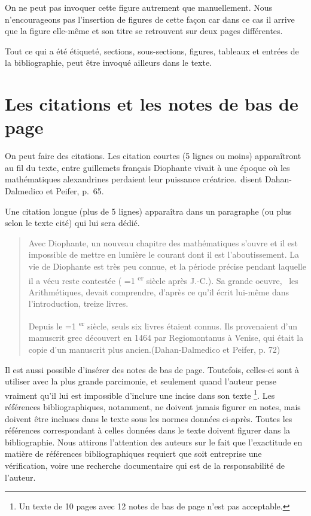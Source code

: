 \documentclass[10pt]{article}
\newcommand{\siecle}[1]{%
\ifnum #1=1%
\uppercase\expandafter{\romannumeral #1}\textsuperscript{er}%
\else%
\uppercase\expandafter{\romannumeral #1}\up{e}%
\fi}
\begin{document}
On ne peut pas invoquer cette figure autrement que manuellement. Nous
n'encourageons pas l'insertion de figures de cette façon car dans ce cas
il arrive que la figure elle-même et son titre se retrouvent sur deux
pages différentes.

Tout ce qui a été étiqueté, sections, sous-sections, figures, tableaux
et entrées de la bibliographie, peut être invoqué ailleurs dans le
texte.

\hypertarget{les-citations-et-les-notes-de-bas-de-page}{%
\section{\texorpdfstring{Les citations et les notes de bas de page
\label{sec5}}{Les citations et les notes de bas de page }}\label{les-citations-et-les-notes-de-bas-de-page}}

On peut faire des citations. Les citation courtes (5 lignes ou moins)
apparaîtront au fil du texte, entre guillemets français \og Diophante
vivait à une époque où les mathématiques alexandrines perdaient leur
puissance créatrice.\fg~disent Dahan-Dalmedico et Peifer\cite{daha},
p.~65.

Une citation longue (plus de 5 lignes) apparaîtra dans un paragraphe (ou
plus selon le texte cité) qui lui sera dédié.

\begin{quote}  Avec Diophante, un nouveau chapitre des mathématiques s'ouvre et il est impossible de mettre en lumière le courant dont il est l'aboutissement. La vie de Diophante est très peu connue, et la période précise pendant laquelle il a vécu reste contestée (\siecle{3} siècle après J.-C.). Sa grande oeuvre, {\ les Arithmétiques}, devait comprendre, d'après ce qu'il écrit lui-même dans l'introduction, treize livres.

 Depuis le \siecle{16} siècle, seuls six livres étaient connus. Ils provenaient d'un manuscrit grec découvert en 1464 par Regiomontanus à Venise, qui était la copie d'un manuscrit plus ancien.(Dahan-Dalmedico et Peifer\cite{daha}, p. 72)\end{quote}

Il est aussi possible d'insérer des notes de bas de page. Toutefois,
celles-ci sont à utiliser avec la plus grande parcimonie, et seulement
quand l'auteur pense vraiment qu'il lui est impossible d'inclure une
incise dans son texte
\footnote {Un texte de 10 pages avec 12 notes de bas de page n'est pas acceptable.}.
Les références bibliographiques, notamment, ne doivent jamais figurer en
notes, mais doivent être incluses dans le texte sous les normes données
ci-après. Toutes les références correspondant à celles données dans le
texte doivent figurer dans la bibliographie. Nous attirons l'attention
des auteurs sur le fait que l'exactitude en matière de références
bibliographiques requiert que soit entreprise une vérification, voire
une recherche documentaire qui est de la responsabilité de l'auteur.
\end{document}

